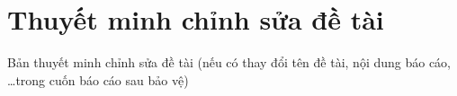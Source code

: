 \chapter*{Thuyết minh chỉnh sửa đề tài}
\label{thanks}

Bản thuyết minh chỉnh sửa đề tài (nếu có thay đổi tên đề tài, nội dung báo cáo, \ldots trong cuốn báo cáo sau bảo vệ)
